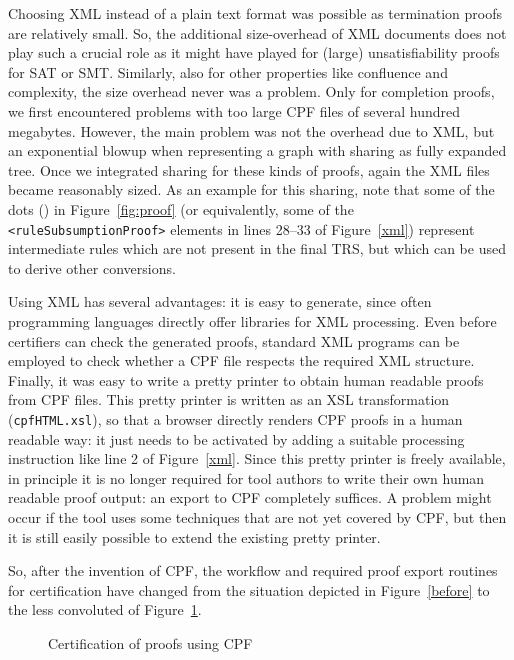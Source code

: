 \documentclass[USenglish]{eptcs}
\newcommand\cime{\textsf{C\kern-0.1ex\textsl{i}ME}\xspace}
\newlength{\len}
\newcommand{\rFI}[1]{Figure~\ref{#1}}
\newcommand\rainbow{\textsf{Rainbow}\xspace}
\newcommand\colorr{\textsf{CoLoR}\xspace}
\newcommand\cocci{\textsf{Coccinelle}\xspace}
\newcommand\isafor{\textsf{Isa\kern-0.2exF\kern-0.2exo\kern-0.2exR}\xspace}
\newcommand\ceta{\textsf{C\kern-0.2exe\kern-0.5exT\kern-0.5exA}\xspace}
\newcommand\colrain{\colorr/\rainbow}
\newcommand\coccime{\cocci/\cime}
\newcommand\isaceta{\isafor/\ceta}
\begin{document}
Choosing XML instead of a plain text format was possible as termination
proofs are relatively small. So, the additional size-overhead of XML documents does
not play such a crucial role as it might have played for (large) 
unsatisfiability proofs for SAT or SMT. Similarly, also for other properties like
confluence and complexity, the size overhead never was a problem. Only for completion proofs,
we first encountered problems with too large CPF files of several hundred megabytes. However,
the main problem was not the overhead due to XML, but an exponential blowup when representing
a graph with sharing as fully expanded tree. Once we integrated sharing for these kinds of 
proofs, again the XML files became reasonably sized. As an example for this sharing, 
note that some of the dots () in \rFI{fig:proof} (or equivalently, some of the
\lstinline!<ruleSubsumptionProof>! elements in lines 28--33 of \rFI{xml}) 
represent intermediate rules which are
not present in the final TRS, but which can be used to derive other conversions.

Using XML has several advantages:
it is easy to generate, since  often programming languages directly offer libraries
for XML processing. Even before certifiers can check the generated proofs, 
standard XML programs can be employed to check whether a CPF file respects the required
XML structure. Finally, it was easy to write a pretty printer to obtain
human readable proofs from CPF files. This pretty printer is written
as an XSL transformation (\texttt{cpfHTML.xsl}), 
so that a browser directly renders CPF proofs in a human readable way:
it just needs to be activated by adding a suitable processing instruction like line 2 of
\rFI{xml}.
Since this pretty printer is freely available,
in principle it is no longer required for tool authors to write their
own human readable proof output: an export to CPF completely suffices. A problem
might occur 
if the tool uses some techniques that are not yet covered by CPF, but then
it is still easily possible to extend the existing pretty printer.

So, after the invention of CPF, the workflow and required proof export
routines for certification have changed from the situation depicted in
\rFI{before} to the less convoluted of \rFI{after}.

\begin{figure}
\centering
{}
\caption{\label{after}Certification of proofs using CPF}
\end{figure}
\end{document}
